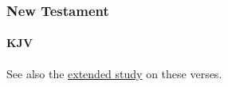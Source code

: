 		
		
	\subsubsection{New Testament} %
		\label{PRAYER-NT}
	
		\paragraph{KJV}
			\label{PRAYER-NT-KJV}		
	
			
			\begin{compactdesc}
				\item[{\hyperref[MATTHEW-6-5]{Matthew 6:5--15}}]
				\item[{\hyperref[LUKE-11-5]{Luke 11:5--13}}]
					\begin{compactitem}
						\item See also the \hyperref[EXSS-NT-LUKE-8-PRAYER]{extended study} on these verses.
					\end{compactitem}
			\end{compactdesc}
			
		
			
				
